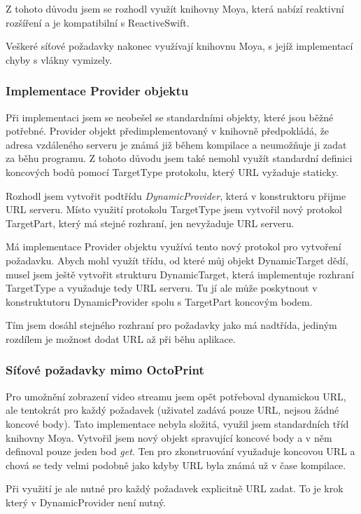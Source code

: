 Z tohoto důvodu jsem se rozhodl využít knihovny Moya, která nabízí reaktivní rozšíření a je kompatibilní s ReactiveSwift.

Veškeré síťové požadavky nakonec využívají knihovnu Moya, s jejíž implementací chyby s vlákny vymizely.

\subsubsection*{Implementace Provider objektu}

Při implementaci jsem se neobešel se standardními objekty, které jsou běžné potřebné.
Provider objekt předimplementovaný v knihovně předpokládá, že adresa vzdáleného serveru je známá již během kompilace a neumožňuje ji zadat za běhu programu.
Z tohoto důvodu jsem také nemohl využít standardní definici koncových bodů pomocí TargetType protokolu, který URL vyžaduje staticky.

Rozhodl jsem vytvořit podtřídu \textit{DynamicProvider}, která v konstruktoru přijme URL serveru.
Místo využití protokolu TargetType jsem vytvořil nový protokol TargetPart, který má stejné rozhraní, jen nevyžaduje URL serveru.

Má implementace Provider objektu využívá tento nový protokol pro vytvoření požadavku.
Abych mohl využít třídu, od které můj objekt DynamicTarget dědí, musel jsem ještě vytvořit strukturu DynamicTarget, která implementuje rozhraní TargetType a využaduje tedy URL serveru.
Tu jí ale může poskytnout v konstruktutoru DynamicProvider spolu s TargetPart koncovým bodem.

Tím jsem dosáhl stejného rozhraní pro požadavky jako má nadtřída, jediným rozdílem je možnost dodat URL až při běhu aplikace.

\subsubsection*{Síťové požadavky mimo OctoPrint}

Pro umožnění zobrazení video streamu jsem opět potřeboval dynamickou URL, ale tentokrát pro každý požadavek (uživatel zadává pouze URL, nejsou žádné koncové body).
Tato implementace nebyla složitá, využil jsem standardních tříd knihovny Moya.
Vytvořil jsem nový objekt spravující koncové body a v něm definoval pouze jeden bod \textit{get}.
Ten pro zkonstruování využaduje koncovou URL a chová se tedy velmi podobně jako kdyby URL byla známá už v čase kompilace.

Při využití je ale nutné pro každý požadavek explicitně URL zadat.
To je krok který v DynamicProvider není nutný.

